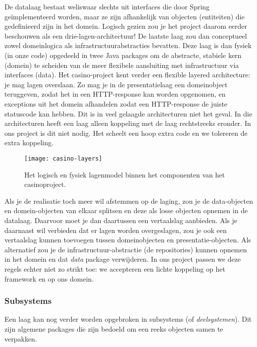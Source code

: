 \documentclass[dutch,a4paper,12pt,doubleside]{book}
\begin{document}
De datalaag bestaat weliswaar slechts uit interfaces die door 
Spring geïmplementeerd worden, maar ze zijn afhankelijk van objecten (entiteiten) die
gedefinieerd zijn in het domein. Logisch gezien zou je het project daarom 
eerder beschouwen als een drie-lagen-architectuur! De laatste laag zou dan 
conceptueel zowel domeinlogica als infrastructuurabstracties bevatten. 
Deze laag is dan fysiek (in onze code) opgedeeld in twee Java packages 
om de abstracte, stabiele kern (domein) te scheiden van de meer flexibele 
aansluiting met infrastructuur via interfaces (data). 
Het casino-project kent verder een flexible layered architecture: 
je mag lagen overslaan.
Zo mag je in de presentatielaag een domeinobject teruggeven,
zodat het in een HTTP-response kan worden opgenomen, en exceptions uit het domein 
afhandelen zodat een HTTP-response de juiste statuscode kan hebben.
Dit is in veel gelaagde architecturen niet het geval. In die architecturen 
heeft een laag alleen koppeling met de laag rechtstreeks eronder.
In ons project is dit niet nodig. Het scheelt een hoop extra code en we 
tolereren de extra koppeling.

\begin{figure}[H]
    \centering
    \texttt{[image: casino-layers]}
    \caption{Het logisch en fysiek lagenmodel binnen het componenten van het casinoproject.}
    \label{fig:casino-layers}
\end{figure}

Als je de realisatie toch meer wil afstemmen op de laging, zou je de 
data-objecten en domein-objecten van elkaar splitsen en deze als losse objecten opnemen in de datalaag.
Daarvoor moet je dan daartussen een vertaalslag aanbieden. 
Als je daarnaast wil verbieden dat er lagen worden overgeslagen, 
zou je ook een vertaalslag kunnen toevoegen tussen domeinobjecten en presentatie-objecten.
Als alternatief zou je de infrastructuur-abstractie
(de repositories) kunnen opnemen in het domein en dat \textit{data} package verwijderen.
In ons project passen we deze regels echter niet zo strikt toe:
we accepteren een lichte koppeling op het framework en op ons domein.

\subsubsection{Subsystems}
Een laag kan nog verder worden opgebroken in subsystems (of \textit{deelsystemen}).
Dit zijn algemene packages die zijn bedoeld om een reeks objecten samen te verpakken.
\end{document}

